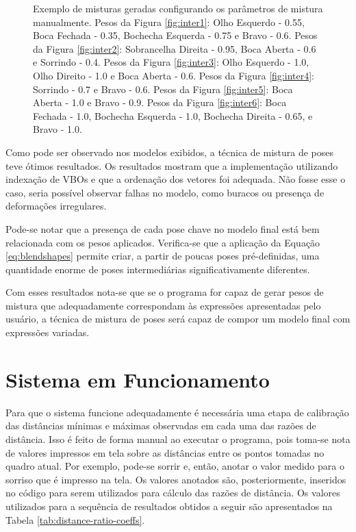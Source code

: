 \begin{figure}[!htb]
  \caption{Exemplo de misturas geradas configurando os parâmetros de mistura manualmente. Pesos da Figura \ref{fig:inter1}: Olho Esquerdo - 0.55, Boca Fechada - 0.35, Bochecha Esquerda - 0.75 e Bravo - 0.6. Pesos da Figura \ref{fig:inter2}: Sobrancelha Direita - 0.95, Boca Aberta - 0.6 e Sorrindo - 0.4. Pesos da Figura \ref{fig:inter3}: Olho Esquerdo - 1.0, Olho Direito - 1.0 e Boca Aberta - 0.6. Pesos da Figura \ref{fig:inter4}: Sorrindo - 0.7 e Bravo - 0.6. Pesos da Figura \ref{fig:inter5}: Boca Aberta - 1.0 e Bravo - 0.9. Pesos da Figura \ref{fig:inter6}: Boca Fechada - 1.0, Bochecha Esquerda - 1.0, Bochecha Direita - 0.65, e Bravo - 1.0.}

  \label{fig:blend-shapes-inter-simple-shapes}
\end{figure}

Como pode ser observado nos modelos exibidos, a técnica de mistura de poses teve ótimos resultados. Os resultados mostram que a implementação utilizando  indexação de VBOs e que a ordenação dos vetores foi adequada. Não fosse esse o caso, seria possível observar falhas no modelo, como  buracos ou presença de deformações irregulares.

Pode-se notar que a presença de cada pose chave no modelo final está bem relacionada com os pesos aplicados. Verifica-se que a aplicação da Equação \ref{eq:blendshapes} permite criar, a partir de poucas poses pré-definidas, uma quantidade enorme de poses intermediárias significativamente diferentes.

Com esses resultados nota-se que se o programa for capaz 
de gerar pesos de mistura que adequadamente correspondam às expressões apresentadas pelo usuário, a técnica de mistura de poses será capaz de compor um modelo final com expressões variadas.

\section{Sistema em Funcionamento}

Para que o sistema funcione adequadamente é necessária uma etapa de calibração das distâncias mínimas e máximas observadas em cada uma das razões de distância. Isso é feito de forma manual ao executar o programa, pois toma-se nota de valores impressos em tela sobre as distâncias entre os pontos tomadas no quadro atual. Por exemplo, pode-se sorrir e, então, anotar o valor medido para o sorriso que é impresso na tela. Os valores anotados são, posteriormente, inseridos no código para serem utilizados para cálculo das razões de distância. Os valores utilizados para a sequência de resultados obtidos a seguir são apresentados na Tabela \ref{tab:distance-ratio-coeffs}.

